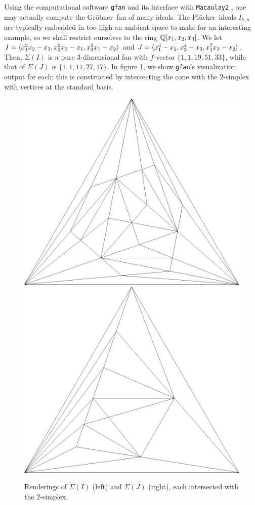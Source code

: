\documentclass[12pt,letter]{article}
\newcommand{\plu}{Pl\"ucker~}
\newcommand{\gro}{Gr\"obner~}
\begin{document}
\begin{example}
Using the computational software \verb|gfan| \cite{gfan} and its interface with \verb|Macaulay2| \cite{M2}, one may actually compute the \gro fan of many ideals. The \plu ideals $I_{k,n}$ are typically embedded in too high an ambient space to make for an interesting example, so we shall restrict ourselves to the ring ${\mathbb Q}[x_1,x_2,x_3]$. We let $I=\langle x_1^2x_2-x_3,x_2^2x_3-x_1,x_3^2x_1-x_2 \rangle$ and $J=\langle x_1^4-x_2,x_2^4-x_3,x_1^7x_3-x_2 \rangle$. Then, $\Sigma(I)$ is a pure 3-dimensional fan with $f$-vector $\{1,1,19,51,33\}$, while that of $\Sigma(J)$ is $\{1,1,11,27,17\}$. In figure \ref{fig1}, we show \verb|gfan|'s visualization output for each; this is constructed by intersecting the cone with the $2$-simplex with vertices at the standard basis.
\begin{figure}\begin{centering}
 \includegraphics[scale=.2]{renderI}\hspace{.5cm}\includegraphics[scale=.2]{renderJ}\caption{Renderings of $\Sigma(I)$ (left) and $\Sigma(J)$ (right), each intersected with the 2-simplex.}\label{fig1}\end{centering}

\end{figure}
\end{example}
\end{document}

